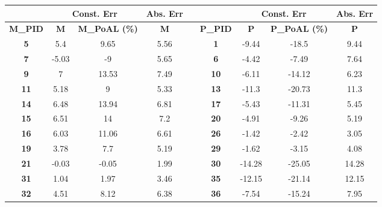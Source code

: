 \begin{table*}[t]
	\begin{center}
			\small
		\begin{tabular}{|c|c|c|c|c|c|c|c|c|}
			\hline
			\textbf{}    & \multicolumn{2}{c|}{\textbf{Const. Err}} & \textbf{Abs. Err} & \textbf{} & \textbf{}    & \multicolumn{2}{c|}{\textbf{Const. Err}} & \textbf{Abs. Err} \\ \hline
			\textbf{M\_PID} & \textbf{M}     & \textbf{M\_PoAL (\%)}   & \textbf{M}       & \textbf{} & \textbf{P\_PID} & \textbf{P}     & \textbf{P\_PoAL (\%)}   & \textbf{P}       \\ \hline
			\textbf{5}    & 5.4         & 9.65          & 5.56          &      & \textbf{1}    & -9.44        & -18.5         & 9.44          \\ \hline
			\textbf{7}    & -5.03        & -9           & 5.65          &      & \textbf{6}    & -4.42        & -7.49         & 7.64          \\ \hline
			\textbf{9}    & 7          & 13.53         & 7.49          &      & \textbf{10}   & -6.11        & -14.12         & 6.23          \\ \hline
			\textbf{11}   & 5.18        & 9           & 5.33          &      & \textbf{13}   & -11.3        & -20.73         & 11.3          \\ \hline
			\textbf{14}   & 6.48        & 13.94         & 6.81          &      & \textbf{17}   & -5.43        & -11.31         & 5.45          \\ \hline
			\textbf{15}   & 6.51        & 14           & 7.2           &      & \textbf{20}   & -4.91        & -9.26         & 5.19          \\ \hline
			\textbf{16}   & 6.03        & 11.06         & 6.61          &      & \textbf{26}   & -1.42        & -2.42         & 3.05          \\ \hline
			\textbf{19}   & 3.78        & 7.7          & 5.19          &      & \textbf{29}   & -1.62        & -3.15         & 4.08          \\ \hline
			\textbf{21}   & -0.03        & -0.05         & 1.99          &      & \textbf{30}   & -14.28       & -25.05         & 14.28          \\ \hline
			\textbf{31}   & 1.04        & 1.97          & 3.46          &      & \textbf{35}   & -12.15       & -21.14         & 12.15          \\ \hline
			\textbf{32}   & 4.51        & 8.12          & 6.38          &      & \textbf{36}   & -7.54        & -15.24         & 7.95          \\ \hline

\end{tabular}
\end{center}
\end{table*}
